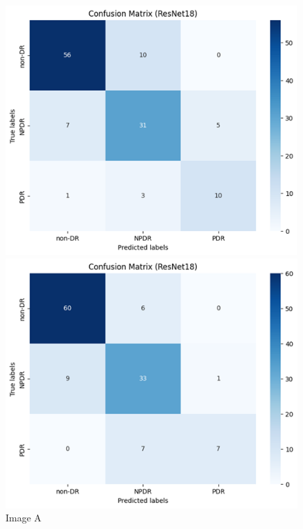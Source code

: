     \begin{figure}[H]
        \begin{minipage}[t]{0.475\textwidth} %
            \includegraphics[draft=false, width=\textwidth]{gambar/confusionMatrixResnet18class-weighted_bestTrain.png} 
            \caption{Image A}
            \label{fig:1a}
        \end{minipage}
        \hfill
        \begin{minipage}[t]{0.475\textwidth} %
            \includegraphics[draft=false, width=\textwidth]{gambar/confusionMatrixResnet18class-weighted_bestVal.png} 

\end{minipage}
\end{figure}
